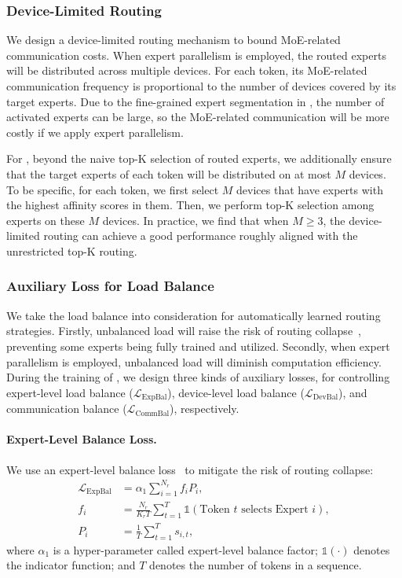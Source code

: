 \subsubsection{Device-Limited Routing}

We design a device-limited routing mechanism to bound MoE-related communication costs. 
When expert parallelism is employed, the routed experts will be distributed across multiple devices. 
For each token, its MoE-related communication frequency is proportional to the number of devices covered by its target experts.
Due to the fine-grained expert segmentation in \dsmoe{}, the number of activated experts can be large, so the MoE-related communication will be more costly if we apply expert parallelism. 

For \dsvii{}, beyond the naive top-K selection of routed experts, we additionally ensure that the target experts of each token will be distributed on at most $M$ devices. 
To be specific, for each token, we first select $M$ devices that have experts with the highest affinity scores in them. 
Then, we perform top-K selection among experts on these $M$ devices. 
In practice, we find that when $M \geq 3$, the device-limited routing can achieve a good performance roughly aligned with the unrestricted top-K routing. 

\subsubsection{Auxiliary Loss for Load Balance}

We take the load balance into consideration for automatically learned routing strategies. 
Firstly, unbalanced load will raise the risk of routing collapse~\citep{moe}, preventing some experts being fully trained and utilized. 
Secondly, when expert parallelism is employed, unbalanced load will diminish computation efficiency. 
During the training of \dsvii{}, we design three kinds of auxiliary losses, for controlling expert-level load balance ($\mathcal{L}_{\mathrm{ExpBal}}$), device-level load balance ($\mathcal{L}_{\mathrm{DevBal}}$), and communication balance ($\mathcal{L}_{\mathrm{CommBal}}$), respectively. 

\paragraph{Expert-Level Balance Loss.}
We use an expert-level balance loss~\citep{switch,gshard} to mitigate the risk of routing collapse:
\begin{align}
    \mathcal{L}_{\mathrm{ExpBal}} & = \alpha_1 \sum_{i=1}^{N_r}{f_i P_i}, \\
    f_i & = \frac{N_r}{K_r T} \sum_{t=1}^{T}{ \mathds{1}( \text{Token $t$ selects Expert $i$} )}, \\
    P_i & = \frac{1}{T} \sum_{t=1}^{T}{s_{i,t}},
\end{align}
where $\alpha_1$ is a hyper-parameter called expert-level balance factor; 
$\mathds{1}(\cdot)$ denotes the indicator function; 
and $T$ denotes the number of tokens in a sequence. 

